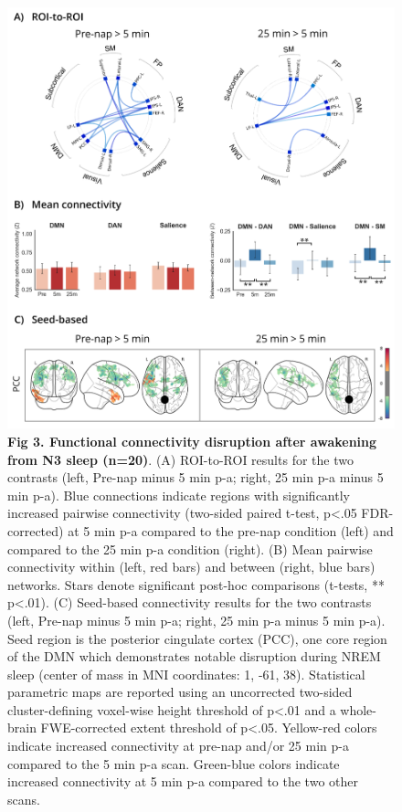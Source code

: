 \begin{figure}[!htbp]
	\includegraphics[width=\textwidth]{Fig/Results/Inertia/Inertia/Fig3_N3.png}
	\caption*{\textbf{Fig 3. Functional connectivity disruption after awakening from N3 sleep (n=20)}. (A) ROI-to-ROI results for the two contrasts (left, Pre-nap minus 5 min p-a; right, 25 min p-a minus 5 min p-a). Blue connections indicate regions with significantly increased pairwise connectivity (two-sided paired t-test, p<.05 FDR-corrected) at 5 min p-a compared to the pre-nap condition (left) and compared to the 25 min p-a condition (right). (B) Mean pairwise connectivity within (left, red bars) and between (right, blue bars) networks. Stars denote significant post-hoc comparisons (t-tests, ** p<.01). (C) Seed-based connectivity results for the two contrasts (left, Pre-nap minus 5 min p-a; right, 25 min p-a minus 5 min p-a). Seed region is the posterior cingulate cortex (PCC), one core region of the DMN which demonstrates notable disruption during NREM sleep (center of mass in MNI coordinates: 1, -61, 38). Statistical parametric maps are reported using an uncorrected two-sided cluster-defining voxel-wise height threshold of p<.01 and a whole-brain FWE-corrected extent threshold of p<.05. Yellow-red colors indicate increased connectivity at pre-nap and/or 25 min p-a compared to the 5 min p-a scan. Green-blue colors indicate increased connectivity at 5 min p-a compared to the two other scans.}
\end{figure}

